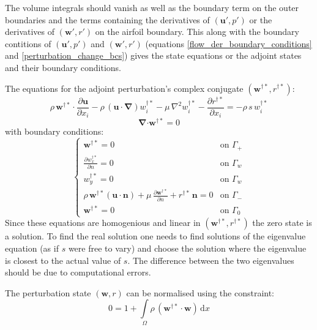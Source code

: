 \documentclass[12pt, a4paper]{article}
\begin{document}
The volume integrals should vanish as well as the boundary term on the outer boundaries and the terms containing the derivatives of $(\mathbf{u'}, p')$ or the derivatives of $(\mathbf{w'}, r')$ on the airfoil boundary. This along with the boundary contitions of $(\mathbf{u'}, p')$ and $(\mathbf{w'}, r')$ (equations \ref{flow_der_boundary_conditions} and \ref{perturbation_change_bcs}) gives the state equations or the adjoint states and their boundary conditions.

The equations for the adjoint perturbation's complex conjugate $(\mathbf{w^{\dagger*}}, r^{\dagger*})$:
\begin{equation}
\rho \, \mathbf{w^{\dagger*} \cdot} \frac{\partial \mathbf{u}}{\partial x_i} - 
\rho \, (\mathbf{u \cdot} \boldsymbol{\nabla}) w^{\dagger*}_i - 
\mu \, \nabla^2 w^{\dagger*}_i - 
\frac{\partial r^{\dagger*}}{\partial x_i} = 
-\rho \, s \, w^{\dagger*}_i
\end{equation}
\begin{equation}
\boldsymbol{\nabla} \mathbf{\cdot w^{\dagger*}} = 0
\end{equation}
with boundary conditions:
\begin{equation}
\begin{cases}
\mathbf{w^{\dagger*}} = 0 & \text{on } \Gamma_+ \\
\frac{\partial w^{\dagger*}_x}{\partial n} = 0 & \text{on } \Gamma_w \\
w^{\dagger*}_y = 0 & \text{on } \Gamma_w \\
\rho \, \mathbf{w^{\dagger*}} (\mathbf{u \cdot n}) + \mu \, \frac{\partial \mathbf{w^{\dagger*}}}{\partial n} + 
r^{\dagger*} \, \mathbf{n} = 0 & \text{on } \Gamma_- \\
\mathbf{w^{\dagger*}} = 0 & \text{on } \Gamma_0
\end{cases}
\end{equation}
Since these equations are homogenious and linear in $(\mathbf{w^{\dagger*}}, r^{\dagger*})$ the zero state is a solution. To find the real solution one needs to find solutions of the eigenvalue equation (as if $s$ were free to vary) and choose the solution where the eigenvalue is closest to the actual value of $s$. The difference between the two eigenvalues should be due to computational errors.

The perturbation state $(\mathbf{w}, r)$ can be normalised using the constraint:
\begin{equation}
0 = 1 + \int\limits_{\Omega}
\rho \, (\mathbf{w^{\dagger*} \cdot w})
\, \mathrm{d} x
\end{equation}
\end{document}
